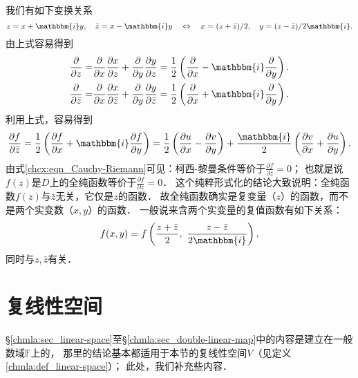 我们有如下变换关系
\begin{equation}
    z= x+ \mathbbm{i} y,\quad \bar{z}= x - \mathbbm{i} y
    \quad \Leftrightarrow \quad
    x = (z+\bar{z})/2, \quad y=(z-\bar{z})/2\mathbbm{i}  .
\end{equation}
由上式容易得到
\begin{align}
    \frac{\partial }{\partial z}= &
       \frac{\partial }{\partial x} \frac{\partial x}{\partial z}
      +\frac{\partial }{\partial y} \frac{\partial y}{\partial z}
      =\frac{1}{2}\left( \frac{\partial }{\partial x} 
        -\mathbbm{i}\frac{\partial }{\partial y} \right) . \\
     \frac{\partial }{\partial \bar{z}}= &
     \frac{\partial }{\partial x} \frac{\partial x}{\partial \bar{z}}
     +\frac{\partial }{\partial y} \frac{\partial y}{\partial \bar{z}}
     =\frac{1}{2}\left( \frac{\partial }{\partial x} 
     +\mathbbm{i}\frac{\partial }{\partial y} \right) .   
\end{align}
利用上式，容易得到
\begin{equation}\label{chcx:eqn_Cauchy-Riemann-2}
    \frac{\partial f }{\partial \bar{z}}
    =\frac{1}{2}\left( \frac{\partial f}{\partial x} 
    +\mathbbm{i}\frac{\partial f}{\partial y} \right) 
    =\frac{1}{2}\left( \frac{\partial u}{\partial x} -\frac{\partial v}{\partial y}\right) 
    +\frac{\mathbbm{i}}{2}\left(\frac{\partial v}{\partial x} + \frac{\partial u}{\partial y} \right) .
\end{equation}
由式\eqref{chcx:eqn_Cauchy-Riemann}可见：柯西-黎曼条件等价于$\frac{\partial f }{\partial \bar{z}}=0$；
也就是说$f(z)$是$D$上的全纯函数等价于$\frac{\partial f }{\partial \bar{z}}=0$．
这个纯粹形式化的结论大致说明：全纯函数$f(z)$与$\bar{z}$无关，{\kaishu 它仅是$z$的函数}．
故全纯函数确实是{\kaishu 复变量}（$z$）的函数，而不是两个实变数（$x,y$）的函数．
一般说来含两个实变量的复值函数有如下关系：
\begin{equation}
    f(x,y)=f\left(\frac{z+\bar{z}}{2},\ \frac{z-\bar{z}}{2\mathbbm{i}}\right),
\end{equation}
同时与$z,\bar{z}$有关．


\section{复线性空间}\label{chcx:sec_cls}
\S\ref{chmla:sec_linear-space}至\S\ref{chmla:sec_double-linear-map}中的内容是建立在一般数域$\mathbb{F}$上的，
那里的结论基本都适用于本节的复线性空间$V$（见定义\eqref{chmla:def_linear-space}）；
此处，我们补充些内容．

